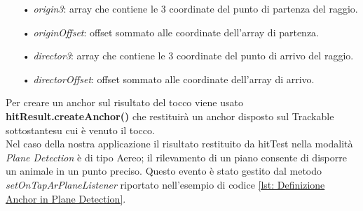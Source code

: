 \documentclass[crop=false, class=book]{standalone}
\begin{document}
	\begin{itemize}
		\item[•] \emph{origin3}: array che contiene le 3 coordinate del punto di partenza del raggio.
		\item[•] \emph{originOffset}: offset sommato alle coordinate dell'array di partenza.
		\item[•] \emph{director3}: array che contiene le 3 coordinate del punto di arrivo del raggio.
		\item[•] \emph{directorOffset}: offset sommato alle coordinate dell'array di arrivo.
	\end{itemize}
	
	\begin{flushleft}
		Per creare un anchor sul risultato del tocco viene usato \textbf{hitResult.createAnchor()} che restituirà un anchor 				disposto sul Trackable sottostantesu cui è venuto il tocco.\\
		Nel caso della nostra applicazione il risultato restituito da hitTest nella modalità \emph{Plane Detection} è di tipo 			Aereo; il rilevamento di un piano consente di disporre un animale in un punto preciso. Questo evento è stato 					gestito dal metodo \textit{setOnTapArPlaneListener} riportato nell'esempio di codice \vref{lst: Definizione Anchor in 			Plane Detection}.\\
	\end{flushleft}
			
	
\end{document}
